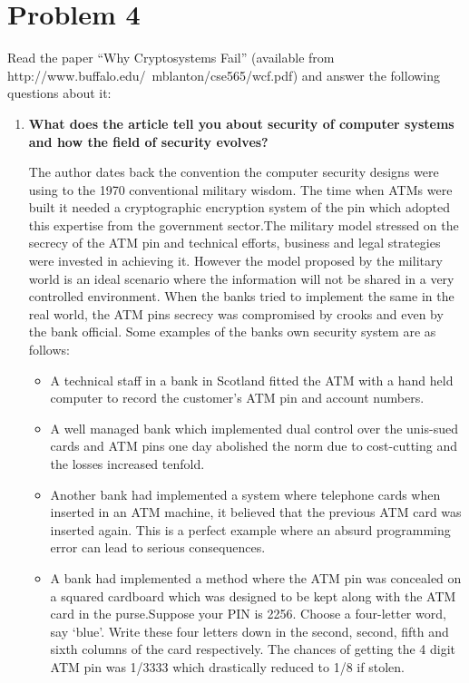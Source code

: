\documentclass{article}
\begin{document}
\section{Problem 4}
Read the paper “Why Cryptosystems Fail” (available from
http://www.buffalo.edu/~mblanton/cse565/wcf.pdf) and answer the following questions
about it:
\begin{enumerate}[label=\alph*]
\item \textbf{What does the article tell you about security of computer systems and how the field of security evolves?}

The author dates back the convention the computer security designs were using to the 1970 conventional military wisdom. The time when ATMs were built it needed a cryptographic encryption system of the pin which adopted this expertise from the government sector.The military model stressed on the secrecy of the ATM pin and technical efforts, business and legal strategies were invested in achieving it. However the model proposed by the military world is an ideal scenario where the information will not be shared in a very controlled environment. When the banks tried to implement the same in the real world, the ATM pins secrecy was compromised  by crooks and even by the bank official. Some examples of the banks own security system are as follows:
\begin{itemize}

\item A technical staff in a bank in Scotland fitted the ATM with a hand held computer to record the customer's ATM pin and account numbers.

\item A well managed bank which implemented dual control over the unis-sued cards and ATM pins one day abolished the norm due to cost-cutting and the losses increased tenfold.

\item Another bank had implemented a system where telephone cards when inserted in an ATM machine, it believed that the previous ATM card was inserted again. This is a perfect example where an absurd programming error can lead to serious consequences.

\item A bank had implemented a method where the ATM pin was concealed on a squared cardboard which was designed to be kept along with the ATM card in the purse.Suppose your PIN is 2256. Choose a four-letter word, say ‘blue’. Write these four letters down in the second, second, fifth and sixth columns of the card respectively. The chances of getting the 4 digit ATM pin was 1/3333 which drastically reduced to 1/8 if stolen.


\end{itemize}
\end{enumerate}
\end{document}
